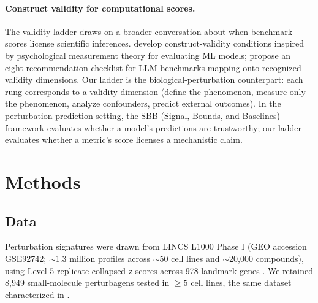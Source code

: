 \documentclass{article}
\begin{document}
\paragraph{Construct validity for computational scores.}
The validity ladder draws on a broader conversation about when benchmark
scores license scientific inferences.
\citet{freiesleben2025benchmarking} develop construct-validity conditions
inspired by psychological measurement theory for evaluating ML models;
\citet{watson2025measuring} propose an eight-recommendation checklist for
LLM benchmarks mapping onto recognized validity dimensions.
Our ladder is the biological-perturbation counterpart: each rung corresponds
to a validity dimension (define the phenomenon, measure only the phenomenon,
analyze confounders, predict external outcomes). In the perturbation-prediction
setting, the SBB (Signal, Bounds, and Baselines) framework
\citep{sbb2026principles} evaluates whether a model's predictions are
trustworthy; our ladder evaluates whether a metric's score licenses a
mechanistic claim.

\section{Methods}

\subsection{Data}

Perturbation signatures were drawn from LINCS L1000 Phase I (GEO accession
GSE92742; $\sim$1.3 million profiles across $\sim$50 cell lines and
$\sim$20{,}000 compounds), using Level 5 replicate-collapsed z-scores
across 978 landmark genes \citep{subramanian2017next}. We retained 8{,}949
small-molecule perturbagens tested in $\geq5$ cell lines, the same dataset
characterized in \citet{tower2026bracket}.
\end{document}
